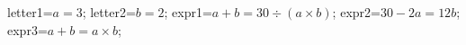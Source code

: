 \documentclass[exercice]{thedocument}%
\begin{document}
%
\>letter1=$a=3$;%
\>letter2=$b=2$;%
\>expr1=$a+b=30\div(a\times b)$;%
\>expr2=$30-2a=12b$;%
\>expr3=$a+b=a\times b$;%
%
\end{document}
